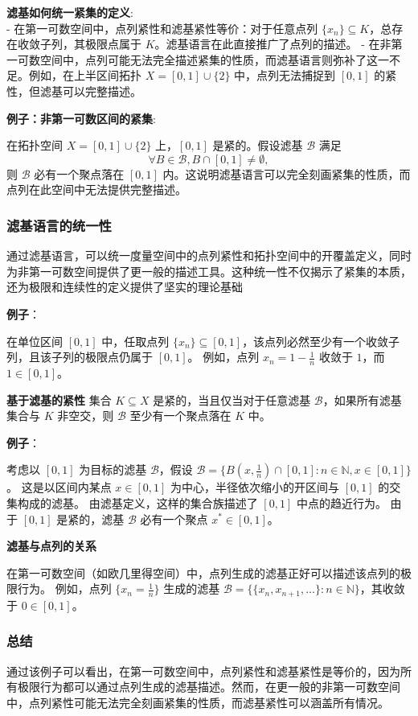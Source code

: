 \documentclass[a4paper, oneside]{article}
\begin{document}
\textbf{滤基如何统一紧集的定义}:\\
- 在第一可数空间中，点列紧性和滤基紧性等价：对于任意点列 $\{x_n\} \subseteq K$，总存在收敛子列，其极限点属于 $K$。滤基语言在此直接推广了点列的描述。
- 在非第一可数空间中，点列可能无法完全描述紧集的性质，而滤基语言则弥补了这一不足。例如，在上半区间拓扑 $X = [0, 1] \cup \{2\}$ 中，点列无法捕捉到 $[0, 1]$ 的紧性，但滤基可以完整描述。

\textbf{例子：非第一可数区间的紧集}:

在拓扑空间 $X = [0, 1] \cup \{2\}$ 上，$[0, 1]$ 是紧的。假设滤基 $\mathcal{B}$ 满足
\[
\forall B \in \mathcal{B}, B \cap [0, 1] \neq \emptyset,
\]
则 $\mathcal{B}$ 必有一个聚点落在 $[0, 1]$ 内。这说明滤基语言可以完全刻画紧集的性质，而点列在此空间中无法提供完整描述。

\subsubsection{滤基语言的统一性}
通过滤基语言，可以统一度量空间中的点列紧性和拓扑空间中的开覆盖定义，同时为非第一可数空间提供了更一般的描述工具。这种统一性不仅揭示了紧集的本质，还为极限和连续性的定义提供了坚实的理论基础

\textbf{例子}：  

在单位区间 \([0, 1]\) 中，任取点列 \(\{x_n\} \subseteq [0, 1]\)，该点列必然至少有一个收敛子列，且该子列的极限点仍属于 \([0, 1]\)。  
例如，点列 \(x_n = 1 - \frac{1}{n}\) 收敛于 \(1\)，而 \(1 \in [0, 1]\)。

\textbf{基于滤基的紧性}
集合 \(K \subseteq X\) 是紧的，当且仅当对于任意滤基 \(\mathcal{B}\)，如果所有滤基集合与 \(K\) 非空交，则 \(\mathcal{B}\) 至少有一个聚点落在 \(K\) 中。

\textbf{例子}： 

考虑以 \([0, 1]\) 为目标的滤基 \(\mathcal{B}\)，假设 \(\mathcal{B} = \{B(x, \frac{1}{n}) \cap [0, 1] : n \in \mathbb{N}, x \in [0, 1]\}\)。  
这是以区间内某点 \(x \in [0, 1]\) 为中心，半径依次缩小的开区间与 \([0, 1]\) 的交集构成的滤基。  
由滤基定义，这样的集合族描述了 \([0, 1]\) 中点的趋近行为。  
由于 \([0, 1]\) 是紧的，滤基 \(\mathcal{B}\) 必有一个聚点 \(x^* \in [0, 1]\)。

\textbf{滤基与点列的关系}

在第一可数空间（如欧几里得空间）中，点列生成的滤基正好可以描述该点列的极限行为。  
例如，点列 \(\{x_n = \frac{1}{n}\}\) 生成的滤基 \(\mathcal{B} = \{ \{x_n, x_{n+1}, \dots\} : n \in \mathbb{N}\}\)，其收敛于 \(0 \in [0, 1]\)。

\subsubsection{总结}
通过该例子可以看出，在第一可数空间中，点列紧性和滤基紧性是等价的，因为所有极限行为都可以通过点列生成的滤基描述。然而，在更一般的非第一可数空间中，点列紧性可能无法完全刻画紧集的性质，而滤基紧性可以涵盖所有情况。
\end{document}
